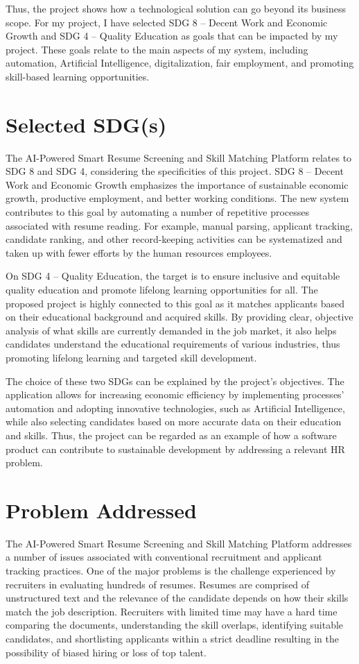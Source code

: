\documentclass[12pt,a4paper]{report}
\begin{document}
Thus, the project shows how a technological solution can go beyond its business scope. For my project, I have selected SDG 8 – Decent Work and Economic Growth and SDG 4 – Quality Education as goals that can be impacted by my project. These goals relate to the main aspects of my system, including automation, Artificial Intelligence, digitalization, fair employment, and promoting skill-based learning opportunities.

\section{Selected SDG(s)}

The AI-Powered Smart Resume Screening and Skill Matching Platform relates to SDG 8 and SDG 4, considering the specificities of this project. SDG 8 – Decent Work and Economic Growth emphasizes the importance of sustainable economic growth, productive employment, and better working conditions. The new system contributes to this goal by automating a number of repetitive processes associated with resume reading. For example, manual parsing, applicant tracking, candidate ranking, and other record-keeping activities can be systematized and taken up with fewer efforts by the human resources employees.

On SDG 4 – Quality Education, the target is to ensure inclusive and equitable quality education and promote lifelong learning opportunities for all. The proposed project is highly connected to this goal as it matches applicants based on their educational background and acquired skills. By providing clear, objective analysis of what skills are currently demanded in the job market, it also helps candidates understand the educational requirements of various industries, thus promoting lifelong learning and targeted skill development.

The choice of these two SDGs can be explained by the project’s objectives. The application allows for increasing economic efficiency by implementing processes’ automation and adopting innovative technologies, such as Artificial Intelligence, while also selecting candidates based on more accurate data on their education and skills. Thus, the project can be regarded as an example of how a software product can contribute to sustainable development by addressing a relevant HR problem.

\section{Problem Addressed}
The AI-Powered Smart Resume Screening and Skill Matching Platform addresses a number of issues associated with conventional recruitment and applicant tracking practices. One of the major problems is the challenge experienced by recruiters in evaluating hundreds of resumes. Resumes are comprised of unstructured text and the relevance of the candidate depends on how their skills match the job description. Recruiters with limited time may have a hard time comparing the documents, understanding the skill overlaps, identifying suitable candidates, and shortlisting applicants within a strict deadline resulting in the possibility of biased hiring or loss of top talent.
\end{document}
